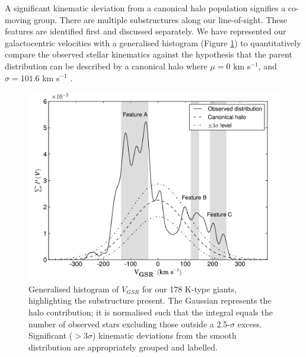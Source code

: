 A significant kinematic deviation from a canonical halo population signifies a co-moving group. There are multiple substructures along our line-of-sight. These features are identified first and discussed separately. We have represented our galactocentric velocities with a generalised histogram (Figure \ref{fig:velocity-histogram}) to quantitatively compare the observed stellar kinematics against the hypothesis that the parent distribution can be described by a canonical halo where $\mu = 0$ km s$^{-1}$, and $\sigma = 101.6$ km s$^{-1}$ \citep{Sirko;et-al_2004}.

	\begin{figure}[h!]
		\includegraphics[width=\columnwidth]{chapter1/velocity_halo.pdf}
		\caption{Generalised histogram of $V_{GSR}$ for our 178 K-type giants, highlighting the substructure present. The Gaussian represents the halo contribution; it is normalised such that the integral equals the number of observed stars excluding those outside a 2.5-$\sigma$ excess. Significant ($>3\sigma$) kinematic deviations from the smooth distribution are appropriately grouped and labelled.}
		\label{fig:velocity-histogram}
	\end{figure}
	
	

